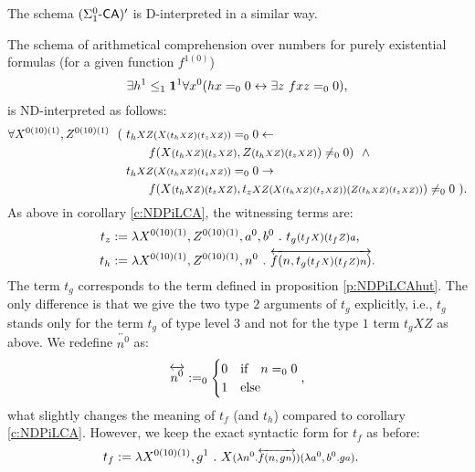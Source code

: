 %
%
The schema $(\Sigma^0_1\textsf{\upshape -}\textsf{\upshape CA})'$ is D-interpreted in a similar way. %
%
\begin{cor}\label{c:NDSiLCAnonsh}
  The schema of arithmetical comprehension over numbers for purely existential
  formulas (for a given function $f^{1(0)}$)
  \[
  \exists h^1\leq_1\mathbf1^1 \forall x^0 (hx=_00 \leftrightarrow \exists z\ fxz=_00)\text{,}
  \]
is ND-interpreted as follows:
\begin{align*}
  \forall X^{\typeOfXZ},Z^{\typeOfXZ}\ \ (\ t_h&\args{XZ(X\args{(t_h\args{XZ})(t_z\args{XZ})})}=_00
        \leftarrow \\
        & \quad f(X \args{(t_h\args{XZ})(t_z\args{XZ})}, 
                  Z \args{(t_h\args{XZ})(t_z\args{XZ})} ) \neq_00)\ \ \wedge\\
 t_h&\args{XZ(X\args{(t_h\args{XZ})(t_z\args{XZ})})}=_00 
         \rightarrow \\
     &\quad f (
           X\args{(t_h\args{XZ})(t_z\args{XZ})}, 
           t_{z}\args{XZ (X\args{(t_h\args{XZ})(t_z\args{XZ})})
                      (Z\args{(t_h\args{XZ})(t_z\args{XZ})}) } 
      ) \neq_00\ )
\text{.}
\end{align*}
As above in corollary \ref{c:NDPiLCA}, the witnessing terms are:
\begin{align*}
t_z&:=\lambda X^{\typeOfXZ},Z^{\typeOfXZ},a^0,b^0\ .\ t_g\args{(t_f\args{X})(t_f\args{Z})a}\text{,}\\
t_h&:=\lambda X^{\typeOfXZ},Z^{\typeOfXZ},n^0\ .\ 
 \overleftrightarrow{f(n,t_g\args{(t_f\args X)(t_f\args Z)n})}
\text{.}
\end{align*}
The term $t_g$ corresponds to the term
defined in proposition \ref{p:NDPiLCAhut}. The only difference is that 
we give the two type $2$ arguments of $t_g$ explicitly, i.e.,
$t_g$ stands only for the term $t_g$ of type level $3$ and not for 
the type $1$ term $t_gXZ$ as above.
We redefine $\overleftrightarrow{n^0}$ as:
\[
\overleftrightarrow{n^0}:=_0\begin{cases}0&\text{if}\quad n=_00\\1&\text{else}\end{cases}\\
\text{,}
\]
what slightly changes the meaning of $t_f$ (and $t_h$) compared to 
corollary \ref{c:NDPiLCA}. However, we keep the exact syntactic
form for $t_f$ as before:
\begin{align*}
t_f&:=\lambda X^{\typeOfXZ},g^1\ .\ 
  X \args{ (\lambda n^0.\overleftrightarrow{f(n,g\args{n})})(\lambda a^0,b^0 . g\args{a}) }
\text{.}
\end{align*}
\end{cor}
